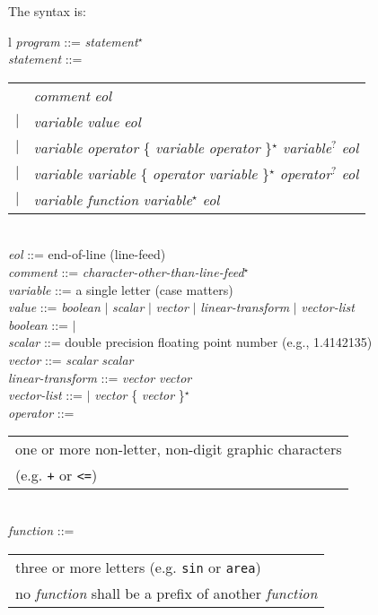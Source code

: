 \documentclass[12pt]{article}
\begin{document}
The syntax is:
\\[1ex]
\hspace*{0.2in}\begin{tabular}{l}
{\em program} ::= {\em statement}$^\star$ \\
{\em statement} ::= \\
\hspace*{0.2in}\begin{tabular}[t]{cl}
                    & {\em comment} {\em eol} \\
                $|$ & {\em variable} \TT{=} {\em value} {\em eol}\\
                $|$ & {\em variable} \TT{=} {\em operator}
		          \{ {\em variable} {\em operator} \}$^\star$
		          {\em variable}$^?$ {\em eol} \\
                $|$ & {\em variable} \TT{=} {\em variable}
		          \{ {\em operator} {\em variable} \}$^\star$
		          {\em operator}$^?$ {\em eol} \\
                $|$ & {\em variable} \TT{=} {\em function}
		          {\em variable}$^\star$ {\em eol} \\
		\end{tabular}
\\[1ex]
{\em eol} ::= end-of-line (line-feed) \\
{\em comment} ::= \TT{\#} {\em character-other-than-line-feed}$^\star$ \\
{\em variable} ::= a single letter (case matters) \\
{\em value} ::= {\em boolean} $|$ {\em scalar} $|$ {\em vector}
	    $|$ {\em linear-transform} $|$ {\em vector-list} \\
{\em boolean} ::=  $|$  \\
{\em scalar} ::= double precision floating point number (e.g., 1.4142135) \\
{\em vector} ::= \TT{(} {\em scalar}\TT{,} {\em scalar} \TT{)} \\
{\em linear-transform} ::= \TT{[} {\em vector}\TT{,} {\em vector} \TT{]} \\
{\em vector-list} ::= \TT{()} $|$
                 \TT{(} {\em vector} \{ \TT{,} {\em vector} \}$^\star$ \TT{)} \\
{\em operator} ::= \begin{tabular}[t]{@{}l}
                   one or more non-letter, non-digit graphic characters \\
                   (e.g. {\tt +} or {\tt <=})\\
		   \end{tabular} \\
{\em function} ::= \begin{tabular}[t]{@{}l@{}}
     three or more letters (e.g. {\tt sin} or {\tt area}) \\
     no {\em function} shall be a prefix of another {\em function} \\
     \end{tabular}
\end{tabular}
\end{document}

